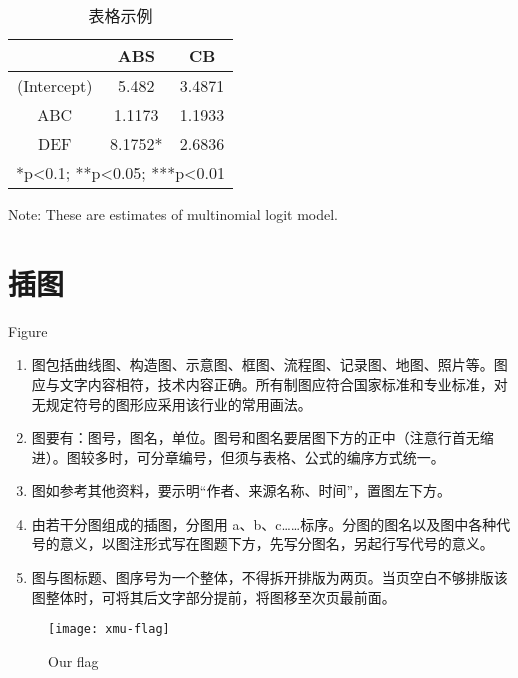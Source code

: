 \begin{table}[!ht]
			\centering
	\begin{threeparttable}[b]
		\caption{表格示例}
		\begin{tabular}{ccc}
			\toprule
			& ABS & CB \\
			\midrule
			(Intercept) & 5.482 & 3.4871 \\
			ABC & 1.1173 & 1.1933 \\
			DEF & 8.1752* & 2.6836 \\
			\bottomrule
			\multicolumn{3}{c}{*p<0.1; **p<0.05; ***p<0.01} \\
			\bottomrule
		\end{tabular}%
		\label{tab:mlogit}%
		\begin{tablenotes}
			Note: These are estimates of multinomial logit model.
		\end{tablenotes}
	\end{threeparttable}
\end{table}%



\section{插图}{Figure}

\begin{enumerate}
	\item 图包括曲线图、构造图、示意图、框图、流程图、记录图、地图、照片等。图应与文字内容相符，技术内容正确。所有制图应符合国家标准和专业标准，对无规定符号的图形应采用该行业的常用画法。
	\item 图要有：图号，图名，单位。图号和图名要居图下方的正中（注意行首无缩进）。图较多时，可分章编号，但须与表格、公式的编序方式统一。
	\item 图如参考其他资料，要示明“作者、来源名称、时间”，置图左下方。
	\item 由若干分图组成的插图，分图用 a、b、c……标序。分图的图名以及图中各种代号的意义，以图注形式写在图题下方，先写分图名，另起行写代号的意义。
	\item 图与图标题、图序号为一个整体，不得拆开排版为两页。当页空白不够排版该图整体时，可将其后文字部分提前，将图移至次页最前面。
\end{enumerate}

\begin{figure}[!ht]
\centering
\texttt{[image: xmu-flag]}
\caption{Our flag} \label{fig11}
\end{figure}


